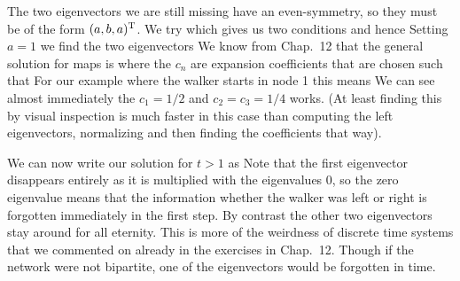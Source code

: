The two eigenvectors we are still missing have an even-symmetry, so they must be of the form $(a,b,a)^{\rm T}$. We try 
which gives us two conditions 
and hence 
Setting $a=1$ we find the two eigenvectors 
We know from Chap.~12 that the general solution for maps is 
where the $c_n$ are expansion coefficients that are chosen such that 
For our example where the walker starts in node 1 this means 
We can see almost immediately the $c_1=1/2$ and $c_2=c_3=1/4$ works. (At least finding this by visual inspection is much faster in this case than computing the left eigenvectors, normalizing and then finding the coefficients that way). 

We can now write our solution for $t>1$ as
Note that the first eigenvector disappears entirely as it is multiplied with the eigenvalues $0$, so the zero eigenvalue means that the information whether the walker was left or right is forgotten immediately in the first step. By contrast the other two eigenvectors stay around for all eternity. This is more of the weirdness of discrete time systems that we commented on already in the exercises in Chap.~12. Though if the network were not bipartite, one of the eigenvectors would be forgotten in time.  

